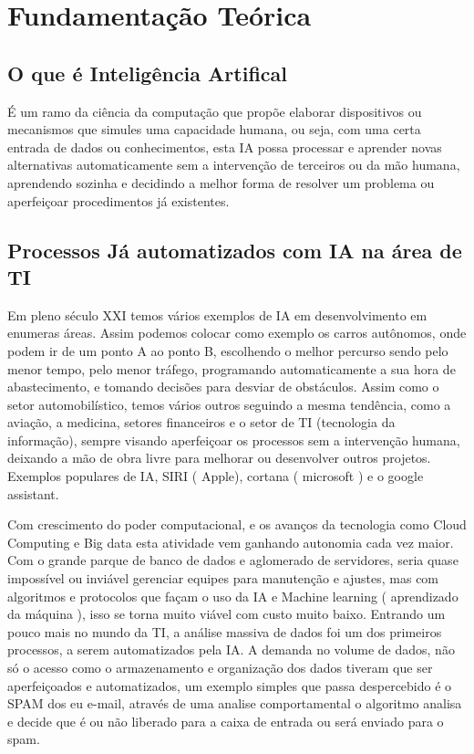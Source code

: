 \chapter{Fundamentação Teórica}
\section{O que é Inteligência Artifical}
É um ramo da ciência da computação que propõe elaborar dispositivos ou mecanismos que simules uma capacidade humana, ou seja, com uma certa entrada de dados ou conhecimentos, esta IA possa processar e aprender novas alternativas automaticamente sem a intervenção de terceiros ou da mão humana, aprendendo sozinha e decidindo a melhor forma de resolver um problema ou aperfeiçoar procedimentos já existentes. 

\section{Processos Já automatizados com IA na área de TI}
	Em pleno século XXI temos vários exemplos de IA em desenvolvimento em enumeras áreas. Assim podemos colocar como exemplo os carros autônomos, onde podem ir de um ponto A ao ponto B, escolhendo o melhor percurso sendo pelo menor tempo, pelo menor tráfego, programando automaticamente a sua hora de abastecimento, e tomando decisões para desviar de obstáculos.
	Assim como o setor automobilístico, temos vários outros seguindo a mesma tendência, como a aviação, a medicina, setores financeiros e o setor de TI (tecnologia da informação), sempre visando aperfeiçoar os processos sem a intervenção humana, deixando a mão de obra livre para melhorar ou desenvolver outros projetos. Exemplos populares de IA, SIRI ( Apple), cortana ( microsoft ) e o google assistant. 
	
	Com crescimento do poder computacional, e os avanços da tecnologia como Cloud Computing e Big data esta atividade vem ganhando autonomia cada vez maior. Com o grande parque de banco de dados e aglomerado de servidores, seria quase impossível ou inviável gerenciar equipes para manutenção e ajustes, mas com algoritmos e protocolos que façam o uso da IA e Machine learning ( aprendizado da máquina ), isso se torna muito viável com custo muito baixo.
	Entrando um pouco mais no mundo da TI, a análise massiva de dados  foi um dos primeiros processos, a serem automatizados pela IA. A demanda no volume de dados, não só o acesso como o armazenamento e organização dos dados tiveram que ser aperfeiçoados e automatizados, um exemplo simples que passa despercebido  é o SPAM dos eu e-mail, através de uma analise comportamental o algoritmo analisa e decide que é ou não liberado para a caixa de entrada ou será enviado para  o spam. 


